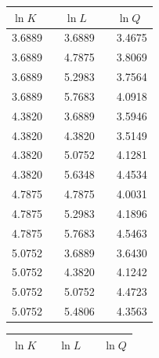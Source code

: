 \documentclass[a4paper,12pt]{article}
\theoremstyle{definition}
\begin{document}
\setlength{\extrarowheight}{0pt}
\begin{table}[H]
\begin{center}
\begin{tabular}{|lllll|} \toprule
    $\ln K$ &  & $\ln L$ &  & $\ln Q$\\ \midrule

								    3.6889 &       &   3.6889    &       &   3.4675 \\
                                    3.6889 &       &  4.7875     &       &    3.8069 \\
                                    3.6889 &      &   5.2983    &       &     3.7564 \\
                                    3.6889 &       &   5.7683   &       &    4.0918 \\
                                    4.3820 &      &    3.6889   &       &   3.5946 \\ 
                                    4.3820 &      &   4.3820   &      &  3.5149 \\
                                    4.3820 &      &    5.0752   &       &   4.1281 \\
                                    4.3820 &      &    5.6348   &      &    4.4534\\
                                    4.7875 &      &    4.7875   &       &   4.0031 \\
                                    4.7875 &       &    5.2983   &       & 4.1896 \\ 
                                    4.7875 &      &    5.7683   &       &  4.5463\\
                                    5.0752 &      &    3.6889   &      &  3.6430 \\
                                    5.0752 &      &   4.3820    &      &  4.1242 \\
                                    5.0752 &       &    5.0752   &       &   4.4723 \\
                                    5.0752 &       &     5.4806  &      &   4.3563 \\ \bottomrule
\end{tabular}
\quad \quad \quad \quad \quad 
\begin{tabular}{|lllll|} \toprule
    $\ln K$ &  & $\ln L$ &  & $\ln Q$\\ \midrule


\end{tabular}
\end{center}
\end{table}
\end{document}
